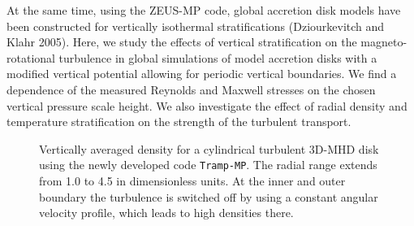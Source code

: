 At the same time, using the ZEUS-MP code, global accretion disk models have
been constructed for vertically isothermal stratifications (Dziourkevitch
and Klahr 2005). Here, we study the effects of vertical stratification on
the magneto-rotational turbulence in global simulations of model accretion
disks with a modified vertical potential allowing for periodic vertical
boundaries. We find a dependence of the measured Reynolds and Maxwell
stresses on the chosen vertical pressure scale height.  We also investigate
the effect of radial density and temperature stratification on the strength
of the turbulent transport.
%
%
\begin{figure}
\caption{
Vertically averaged density for a cylindrical turbulent 3D-MHD disk using the 
newly developed code {\tt Tramp-MP}. The radial range extends from 1.0 to 4.5
in dimensionless units. At the inner and outer boundary the turbulence is
switched off by using a constant angular velocity profile, which leads to high
densities there.
}
\label{fig:c1_2}
\end{figure}

